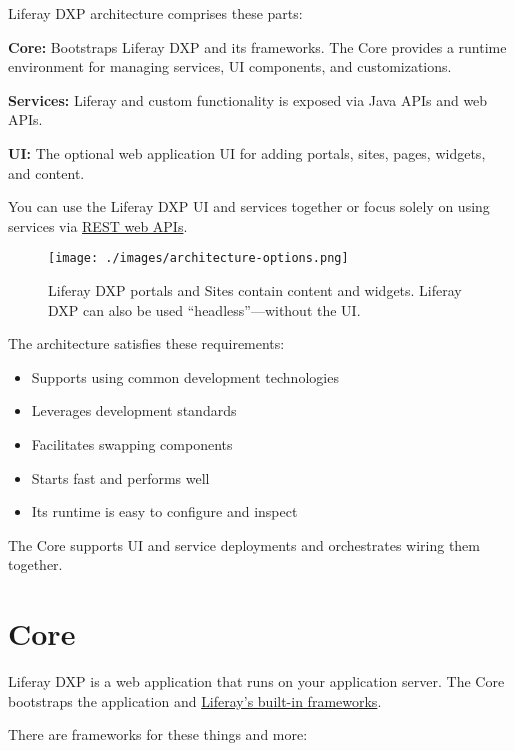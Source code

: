 Liferay DXP architecture comprises these parts:

\textbf{Core:} Bootstraps Liferay DXP and its frameworks. The Core
provides a runtime environment for managing services, UI components, and
customizations.

\textbf{Services:} Liferay and custom functionality is exposed via Java
APIs and web APIs.

\textbf{UI:} The optional web application UI for adding portals, sites,
pages, widgets, and content.

You can use the Liferay DXP UI and services together or focus solely on
using services via
\href{/docs/7-2/frameworks/-/knowledge_base/f/headless-rest-apis}{REST
web APIs}.

\begin{figure}
\centering
\texttt{[image: ./images/architecture-options.png]}
\caption{Liferay DXP portals and Sites contain content and widgets.
Liferay DXP can also be used ``headless''---without the UI.}
\end{figure}

The architecture satisfies these requirements:

\begin{itemize}
\item
  Supports using common development technologies
\item
  Leverages development standards
\item
  Facilitates swapping components
\item
  Starts fast and performs well
\item
  Its runtime is easy to configure and inspect
\end{itemize}

The Core supports UI and service deployments and orchestrates wiring
them together.

\section{Core}\label{core}

Liferay DXP is a web application that runs on your application server.
The Core bootstraps the application and
\href{/docs/7-2/frameworks/-/knowledge_base/f/frameworks}{Liferay's
built-in frameworks}.

There are frameworks for these things and more:

